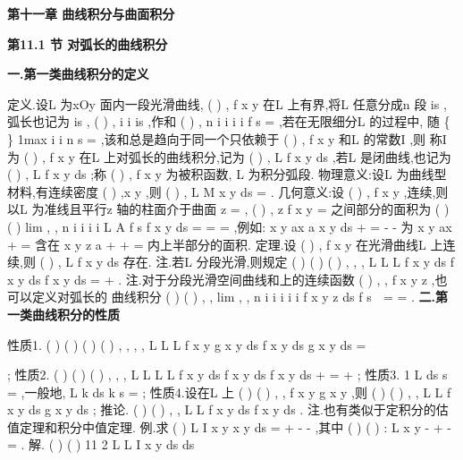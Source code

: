 \begin{center}
{\Large \bfseries \textcolor{lyred}{第十一章 曲线积分与曲面积分}}
\end{center}

\vspace{6pt}
{\large \bfseries \textcolor{lyred}{第11.1 节 对弧长的曲线积分}}

\vspace{4pt}
{\bfseries \textcolor{lyred}{一.第一类曲线积分的定义}}

\textcolor{lyred}{定义}.设L 为xOy 面内一段光滑曲线,
(
)
,
f x y 在L 上有界,将L 任意分成n 段
is
\Delta , 
弧长也记为
is
\Delta ,
(
)
,
i
i
is
\psi \eta 
\forall 
\in \Delta ,作和
(
)
,
n
i
i
i
i
f
s
\psi \eta 
=
\Delta 
\sum 
,若在无限细分L 的过程中, 
随
\{
\}
1max
i
i n
s
\lambda 
\le \le 
=
\Delta 
\to 
,该和总是趋向于同一个只依赖于
(
)
,
f x y 和L 的常数I ,则 
称I 为
(
)
,
f x y 在L 上\textcolor{lyred}{对弧长的曲线积分},记为
(
)
,
L
f x y ds
\int 
,若L 是闭曲线,也记为 
(
)
,
L
f x y ds
\int \nabla 
;称
(
)
,
f x y 为\textcolor{lyred}{被积函数}, L 为\textcolor{lyred}{积分弧段}. 
\textcolor{lyred}{物理意义}:设L 为曲线型材料,有连续密度
(
)
,x y
\mu 
,则
(
)
,
L
M
x y ds
\mu 
=\int 
. 
\textcolor{lyred}{几何意义}:设
(
)
,
f x y \ge 
,连续,则以L 为准线且平行z 轴的柱面介于曲面
z =
, 
(
)
,
z
f x y
=
之间部分的面积为
(
)
(
)
lim
,
,
n
i
i
i
i
L
A
f
s
f x y ds
\lambda 
\psi \eta 
\to 
=
=
\Delta 
=
\sum 
\int 
,例如: 
x
y
ax
a
x
y ds
+
=
-
-
\int \nabla 
为
x
y
ax
+
=
含在
x
y
z
a
+
+
=
内上半部分的面积. 
\textcolor{lyred}{定理}.设
(
)
,
f x y 在光滑曲线L 上连续,则
(
)
,
L
f x y ds
\int 
存在. 
\textcolor{lyred}{注}.若L 分段光滑,则规定
(
)
(
)
(
)
,
,
,
L
L
L
f x y ds
f x y ds
f x y ds
=
+
\int 
\int 
\int 
. 
\textcolor{lyred}{注}.对于分段光滑空间曲线\Gamma 和\Gamma 上的连续函数
(
)
, ,
f x y z ,也可以定义\textcolor{lyred}{对弧长的 }
\textcolor{lyred}{曲线积分}
(
)
(
)
, ,
lim
,
,
n
i
i
i
i
i
f x y z ds
f
s
\lambda 
\psi \eta 
\to 
=
\Gamma 
=
\Delta 
\sum 
\int 
. 
\vspace{4pt}
{\bfseries \textcolor{lyred}{二.第一类曲线积分的性质}}

\textcolor{lyred}{性质1}.
(
)
(
)
(
)
(
)
,
,
,
,
L
L
L
f x y
g x y
ds
f x y ds
g x y ds
\alpha 
\beta 
\alpha 
\beta 
\pm 
=
\pm 




\int 
\int 
\int 
; 
\textcolor{lyred}{性质2}.
(
)
(
)
(
)
,
,
,
L
L
L
L
f x y ds
f x y ds
f x y ds
+
=
+
\int 
\int 
\int 
; 
\textcolor{lyred}{性质3}. 1
L
ds
s
\cdots 
=
\int 
,一般地,
L
k ds
k s
\cdots 
=
\cdots 
\int 
; 
\textcolor{lyred}{性质4}.设在L 上
(
)
(
)
,
,
f x y
g x y
\le 
,则
(
)
(
)
,
,
L
L
f x y ds
g x y ds
\le 
\int 
\int 
; 
\textcolor{lyred}{推论}.
(
)
(
)
,
,
L
L
f x y ds
f x y ds
\le 
\int 
\int 
. 
\textcolor{lyred}{注}.也有类似于定积分的估值定理和积分中值定理. 
\textcolor{lyred}{例}.求
(
)
L
I
x
y
x
y ds
=
+
-
-
\int \nabla 
,其中
(
)
(
)
:
L
x
y
-
+
-
=
. 
解.
(
)
(
)
11 2
L
L
I
x
y
ds
ds
\pi 
\pi 


